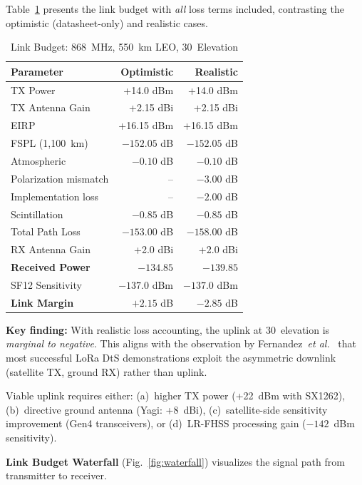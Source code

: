 \documentclass[11pt,a4paper]{article}
\begin{document}
Table~\ref{tab:link_budget} presents the link budget with \emph{all} loss terms included, contrasting the optimistic (datasheet-only) and realistic cases.

\begin{table}[H]
\centering
\caption{Link Budget: 868~MHz, 550~km LEO, 30\textdegree\ Elevation}
\begin{tabular}{lrr}
\toprule
\textbf{Parameter} & \textbf{Optimistic} & \textbf{Realistic} \\
\midrule
TX Power & +14.0 dBm & +14.0 dBm \\
TX Antenna Gain & +2.15 dBi & +2.15 dBi \\
EIRP & +16.15 dBm & +16.15 dBm \\
\midrule
FSPL (1,100~km) & $-152.05$ dB & $-152.05$ dB \\
Atmospheric & $-0.10$ dB & $-0.10$ dB \\
Polarization mismatch & -- & $-3.00$ dB \\
Implementation loss & -- & $-2.00$ dB \\
Scintillation & $-0.85$ dB & $-0.85$ dB \\
\midrule
Total Path Loss & $-153.00$ dB & $-158.00$ dB \\
\midrule
RX Antenna Gain & +2.0 dBi & +2.0 dBi \\
\textbf{Received Power} & $\mathbf{-134.85}$ & $\mathbf{-139.85}$ \\
\midrule
SF12 Sensitivity & $-137.0$ dBm & $-137.0$ dBm \\
\textbf{Link Margin} & $\mathbf{+2.15}$ dB & $\mathbf{-2.85}$ dB \\
\bottomrule
\end{tabular}
\label{tab:link_budget}
\end{table}

\textbf{Key finding:} With realistic loss accounting, the uplink at 30\textdegree\ elevation is \emph{marginal to negative}. This aligns with the observation by Fernandez~\emph{et al.}~\cite{fernandez2020} that most successful LoRa DtS demonstrations exploit the asymmetric downlink (satellite TX, ground RX) rather than uplink.

Viable uplink requires either: (a)~higher TX power (+22~dBm with SX1262), (b)~directive ground antenna (Yagi: +8~dBi), (c)~satellite-side sensitivity improvement (Gen4 transceivers), or (d)~LR-FHSS processing gain ($-142$~dBm sensitivity).

\textbf{Link Budget Waterfall} (Fig.~\ref{fig:waterfall}) visualizes the signal path from transmitter to receiver.
\end{document}
